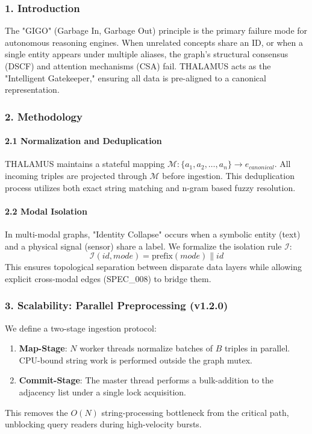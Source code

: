 \documentclass[10pt,journal,compsoc]{IEEEtran}
\begin{document}
\subsubsection{1. Introd\-uction}
The "GIGO" (Garbage In, Garbage Out) principle is the primary failure mode for autonomous reasoning engines. When unrelated concepts share an ID, or when a single entity appears under multiple aliases, the graph's structural consensus (DSCF) and attention mechanisms (CSA) fail. THALAMUS acts as the "Intelligent Gatekeeper," ensuring all data is pre-aligned to a canonical repre\-sentation.

\subsubsection{2. Methodology}

\paragraph{2.1 Normal\-ization and Dedupl\-ication}
THALAMUS maintains a stateful mapping $\mathcal{M}: \{a_1, a_2, \dots, a_n\} \to e_{canonical}$. All incoming triples are projected through $\mathcal{M}$ before ingestion. This dedup\-lication process \cite{doan2012principles} utilizes both exact string matching and n-gram based fuzzy resolution.

\paragraph{2.2 Modal Isolation}
In multi-modal graphs, "Identity Collapse" occurs when a symbolic entity (text) and a physical signal (sensor) share a label. We formalize the isolation rule $\mathcal{I}$:
\begin{equation}
\mathcal{I}(id, mode) = \text{prefix}(mode) \mathbin{\|} id
\end{equation}
This ensures topological separation between disparate data layers while allowing explicit cross-modal edges (SPEC\_008) to bridge them.

\subsubsection{3. Scalability: Parallel Prepro\-cessing (v1.2.0)}
We define a two-stage ingestion protocol:
\begin{enumerate}
\item \textbf{Map-Stage}: $N$ worker threads normalize batches of $B$ triples in parallel. CPU-bound string work is performed outside the graph mutex.
\item \textbf{Commit-Stage}: The master thread performs a bulk-addition to the adjacency list under a single lock acquisition.
\end{enumerate}
This removes the $O(N)$ string-processing bottleneck from the critical path, unblocking query readers during high-velocity bursts.
\end{document}
